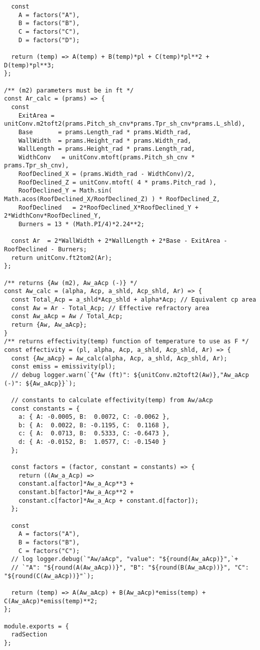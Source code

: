 \begin{verbatim}
  const 
    A = factors("A"),
    B = factors("B"),
    C = factors("C"),
    D = factors("D");

  return (temp) => A(temp) + B(temp)*pl + C(temp)*pl**2 + D(temp)*pl**3;
};

/** (m2) parameters must be in ft */
const Ar_calc = (prams) => {
  const
    ExitArea = unitConv.m2toft2(prams.Pitch_sh_cnv*prams.Tpr_sh_cnv*prams.L_shld),
    Base       = prams.Length_rad * prams.Width_rad,
    WallWidth  = prams.Height_rad * prams.Width_rad,
    WallLength = prams.Height_rad * prams.Length_rad,
    WidthConv   = unitConv.mtoft(prams.Pitch_sh_cnv * prams.Tpr_sh_cnv),
    RoofDeclined_X = (prams.Width_rad - WidthConv)/2,
    RoofDeclined_Z = unitConv.mtoft( 4 * prams.Pitch_rad ),
    RoofDeclined_Y = Math.sin( Math.acos(RoofDeclined_X/RoofDeclined_Z) ) * RoofDeclined_Z,
    RoofDeclined   = 2*RoofDeclined_X*RoofDeclined_Y + 2*WidthConv*RoofDeclined_Y,
    Burners = 13 * (Math.PI/4)*2.24**2;
    
  const Ar  = 2*WallWidth + 2*WallLength + 2*Base - ExitArea - RoofDeclined - Burners;
  return unitConv.ft2tom2(Ar);
};

/** returns {Aw (m2), Aw_aAcp (-)} */
const Aw_calc = (alpha, Acp, a_shld, Acp_shld, Ar) => {
  const Total_Acp = a_shld*Acp_shld + alpha*Acp; // Equivalent cp area
  const Aw = Ar - Total_Acp; // Effective refractory area
  const Aw_aAcp = Aw / Total_Acp;
  return {Aw, Aw_aAcp};
}
/** returns effectivity(temp) function of temperature to use as F */
const effectivity = (pl, alpha, Acp, a_shld, Acp_shld, Ar) => {
  const {Aw_aAcp} = Aw_calc(alpha, Acp, a_shld, Acp_shld, Ar);
  const emiss = emissivity(pl);
  // debug logger.warn(`{"Aw (ft)": ${unitConv.m2toft2(Aw)},"Aw_aAcp (-)": ${Aw_aAcp}}`);

  // constants to calculate effectivity(temp) from Aw/aAcp
  const constants = {
    a: { A: -0.0005, B:  0.0072, C: -0.0062 },
    b: { A:  0.0022, B: -0.1195, C:  0.1168 },
    c: { A:  0.0713, B:  0.5333, C: -0.6473 },
    d: { A: -0.0152, B:  1.0577, C: -0.1540 }
  };

  const factors = (factor, constant = constants) => {
    return ((Aw_a_Acp) => 
    constant.a[factor]*Aw_a_Acp**3 + 
    constant.b[factor]*Aw_a_Acp**2 + 
    constant.c[factor]*Aw_a_Acp + constant.d[factor]);
  };

  const 
    A = factors("A"),
    B = factors("B"),
    C = factors("C");
  // log logger.debug(`"Aw/aAcp", "value": "${round(Aw_aAcp)}",`+
  // `"A": "${round(A(Aw_aAcp))}", "B": "${round(B(Aw_aAcp))}", "C": "${round(C(Aw_aAcp))}"`);

  return (temp) => A(Aw_aAcp) + B(Aw_aAcp)*emiss(temp) + C(Aw_aAcp)*emiss(temp)**2;
};

module.exports = {
  radSection
};
\end{verbatim}


